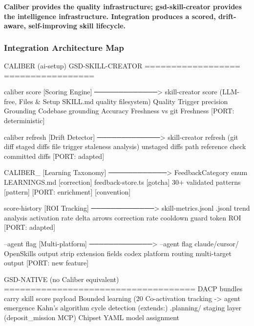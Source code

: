 \documentclass[11pt,letterpaper]{article}
\begin{document}
\textbf{Caliber provides the quality infrastructure; gsd-skill-creator provides the intelligence infrastructure. Integration produces a scored, drift-aware, self-improving skill lifecycle.}

\subsubsection{Integration Architecture Map}

\begin{asciibox}
                    CALIBER (ai-setup)                  GSD-SKILL-CREATOR
                    ==================                  =================

  caliber score     [Scoring Engine]  ─────────────>   skill-creator score
  (LLM-free,        Files \& Setup                      SKILL.md quality
   filesystem)      Quality                            Trigger precision
                    Grounding                          Codebase grounding
                    Accuracy                           Freshness vs git
                    Freshness                          [PORT: deterministic]

  caliber refresh   [Drift Detector]  ─────────────>   skill-creator refresh
  (git diff         staged diffs                       file trigger staleness
   analysis)        unstaged diffs                     path reference check
                    committed diffs                    [PORT: adapted]

  CALIBER\_          [Learning Taxonomy] ────────────>   FeedbackCategory enum
  LEARNINGS.md      [correction]                        feedback-store.ts
                    [gotcha]                            30+ validated patterns
                    [pattern]                           [PORT: enrichment]
                    [convention]

  score-history     [ROI Tracking]    ─────────────>   skill-metrics.jsonl
  .jsonl            trend analysis                     activation rate
                    delta arrows                       correction rate
                    cooldown guard                     token ROI
                                                       [PORT: adapted]

  --agent flag      [Multi-platform]  ─────────────>   --agent flag
  claude/cursor/    OpenSkills output                  strip extension fields
  codex             platform routing                   multi-target output
                                                       [PORT: new feature]

                    GSD-NATIVE (no Caliber equivalent)
                    ====================================
                    DACP bundles carry skill score payload
                    Bounded learning (20%
                    Co-activation tracking -> agent emergence
                    Kahn's algorithm cycle detection (extends:)
                    .planning/ staging layer (deposit\_mission MCP)
                    Chipset YAML model assignment
\end{asciibox}
\end{document}
